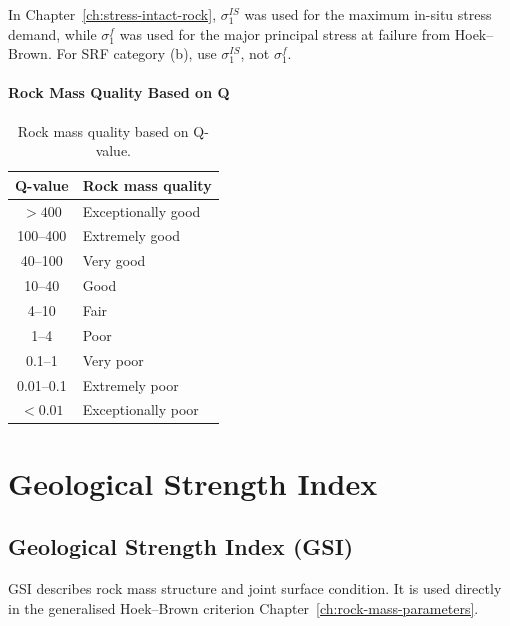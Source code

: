\begin{notebox}
In Chapter~\ref{ch:stress-intact-rock}, \(\sigma_1^{IS}\) was used for the maximum in-situ stress demand, while
\(\sigma_1^f\) was used for the major principal stress at failure from Hoek--Brown.
For SRF category (b), use \(\sigma_1^{IS}\), not \(\sigma_1^f\).
\end{notebox}

\paragraph{Rock Mass Quality Based on Q}

\begin{table}[H]
\centering
\small
\begin{tabular}{c l}
\toprule
\textbf{Q-value} & \textbf{Rock mass quality} \\
\midrule
\(>400\) & Exceptionally good \\
100--400 & Extremely good \\
40--100 & Very good \\
10--40 & Good \\
4--10 & Fair \\
1--4 & Poor \\
0.1--1 & Very poor \\
0.01--0.1 & Extremely poor \\
\(<0.01\) & Exceptionally poor \\
\bottomrule
\end{tabular}
\caption{Rock mass quality based on Q-value.}
\label{tab:q_quality}
\end{table}

\section{Geological Strength Index}
\label{sec:geological-strength-index}

\subsection{Geological Strength Index (GSI)}

GSI describes rock mass structure and joint surface condition. It is used directly in
the generalised Hoek--Brown criterion Chapter~\ref{ch:rock-mass-parameters}.

